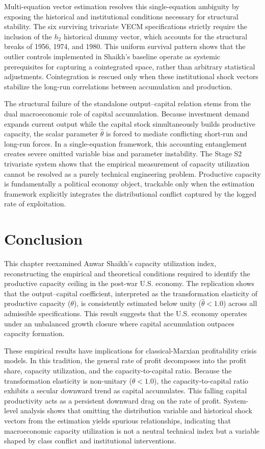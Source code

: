 \documentclass[11pt]{article}
\begin{document}
Multi-equation vector estimation resolves this single-equation ambiguity by exposing the historical and institutional conditions necessary for structural stability. The six surviving trivariate VECM specifications strictly require the inclusion of the $h_2$ historical dummy vector, which accounts for the structural breaks of 1956, 1974, and 1980. This uniform survival pattern shows that the outlier controls implemented in Shaikh's baseline operate as systemic prerequisites for capturing a cointegrated space, rather than arbitrary statistical adjustments. Cointegration is rescued only when these institutional shock vectors stabilize the long-run correlations between accumulation and production.

The structural failure of the standalone output--capital relation stems from the dual macroeconomic role of capital accumulation. Because investment demand expands current output while the capital stock simultaneously builds productive capacity, the scalar parameter $\hat{\theta}$ is forced to mediate conflicting short-run and long-run forces. In a single-equation framework, this accounting entanglement creates severe omitted variable bias and parameter instability. The Stage S2 trivariate system shows that the empirical measurement of capacity utilization cannot be resolved as a purely technical engineering problem. Productive capacity is fundamentally a political economy object, trackable only when the estimation framework explicitly integrates the distributional conflict captured by the logged rate of exploitation.

\section{Conclusion}
\label{sec:conclusion}

This chapter reexamined Anwar Shaikh’s capacity utilization index, reconstructing the empirical and theoretical conditions required to identify the productive capacity ceiling in the post-war U.S. economy. The replication shows that the output--capital coefficient, interpreted as the transformation elasticity of productive capacity ($\theta$), is consistently estimated below unity ($\hat{\theta} < 1.0$) across all admissible specifications. This result suggests that the U.S. economy operates under an unbalanced growth closure where capital accumulation outpaces capacity formation.

These empirical results have implications for classical-Marxian profitability crisis models. In this tradition, the general rate of profit decomposes into the profit share, capacity utilization, and the capacity-to-capital ratio. Because the transformation elasticity is non-unitary ($\theta < 1.0$), the capacity-to-capital ratio exhibits a secular downward trend as capital accumulates. This falling capital productivity acts as a persistent downward drag on the rate of profit. System-level analysis shows that omitting the distribution variable and historical shock vectors from the estimation yields spurious relationships, indicating that macroeconomic capacity utilization is not a neutral technical index but a variable shaped by class conflict and institutional interventions.
\end{document}
